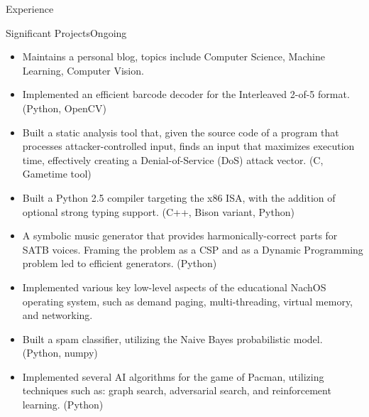 \documentclass{resume}
\begin{document}
\begin{component}{Experience}
\begin{position}{Significant Projects}{Ongoing}
	\begin{itemize}
        \vspace{-0.5em}\item Maintains a personal blog, topics include 
        Computer Science, Machine Learning, Computer Vision.
	        \vspace{-0.5em}\item Implemented an efficient barcode decoder
	        for the Interleaved 2-of-5 format. (Python, OpenCV)
		\vspace{-0.5em}\item Built a static analysis tool that, given the source code of a program that
		processes attacker-controlled input, finds an input that maximizes execution time, effectively
		creating a Denial-of-Service (DoS) attack vector. (C, Gametime tool)
		\vspace{-0.5em}\item Built a Python 2.5 compiler targeting the x86 ISA, with the addition of
		optional strong typing support. (C++, Bison variant, Python)
		\vspace{-0.5em}\item A symbolic music generator that provides harmonically-correct
		parts for SATB voices. Framing the problem as a CSP and as a Dynamic Programming problem led to efficient generators.
		(Python)
		\vspace{-0.5em}\item Implemented various key low-level aspects of the 
		educational NachOS operating system, such as demand paging, multi-threading, virtual memory, and 
		networking.
		\vspace{-0.5em}\item Built a spam classifier, utilizing the Naive Bayes probabilistic model. (Python, numpy)
		\vspace{-0.5em}\item Implemented several AI algorithms for the game of Pacman, utilizing
		techniques such as: graph search, adversarial search, and reinforcement learning. (Python)
	\end{itemize}
	\end{position}
\end{component}

\vspace{-2.0em}
\end{document}
